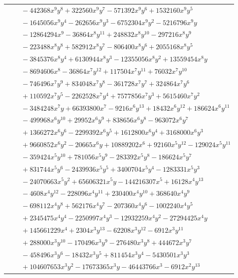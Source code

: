 \documentclass[11pt]{article}
\begin{document}
\begin{longtable}{@{}ll@{}}
 & $\quad -442368x^{9}y^{8}+322560x^{9}y^{7}-571392x^{9}y^{6}+1532160x^{9}y^{5}$\\
 & $\quad -1645056x^{9}y^{4}-262656x^{9}y^{3}-6752304x^{9}y^{2}-5216796x^{9}y$\\
 & $\quad -12864294x^{9}-36864x^{8}y^{11}+248832x^{8}y^{10}-297216x^{8}y^{9}$\\
 & $\quad -223488x^{8}y^{8}+582912x^{8}y^{7}-806400x^{8}y^{6}+2055168x^{8}y^{5}$\\
 & $\quad -3845376x^{8}y^{4}+6130944x^{8}y^{3}-12355056x^{8}y^{2}+13559454x^{8}y$\\
 & $\quad -8694606x^{8}-36864x^{7}y^{12}+117504x^{7}y^{11}+76032x^{7}y^{10}$\\
 & $\quad -746496x^{7}y^{9}+834048x^{7}y^{8}-361728x^{7}y^{7}+324864x^{7}y^{6}$\\
 & $\quad +110592x^{7}y^{5}-2262528x^{7}y^{4}+7577856x^{7}y^{3}+5615460x^{7}y^{2}$\\
 & $\quad -3484248x^{7}y+66393800x^{7}-9216x^{6}y^{13}+18432x^{6}y^{12}+186624x^{6}y^{11}$\\
 & $\quad -499968x^{6}y^{10}+29952x^{6}y^{9}+838656x^{6}y^{8}-963072x^{6}y^{7}$\\
 & $\quad +1366272x^{6}y^{6}-2299392x^{6}y^{5}+1612800x^{6}y^{4}+3168000x^{6}y^{3}$\\
 & $\quad +9660852x^{6}y^{2}-20665x^{6}y+10889202x^{6}+92160x^{5}y^{12}-129024x^{5}y^{11}$\\
 & $\quad -359424x^{5}y^{10}+781056x^{5}y^{9}-283392x^{5}y^{8}-186624x^{5}y^{7}$\\
 & $\quad +831744x^{5}y^{6}-2439936x^{5}y^{5}+3400704x^{5}y^{4}-1283331x^{5}y^{3}$\\
 & $\quad -24070663x^{5}y^{2}+65606321x^{5}y-144216307x^{5}+16128x^{4}y^{13}$\\
 & $\quad -4608x^{4}y^{12}-228096x^{4}y^{11}+230400x^{4}y^{10}+368640x^{4}y^{9}$\\
 & $\quad -698112x^{4}y^{8}+562176x^{4}y^{7}-207360x^{4}y^{6}-1002240x^{4}y^{5}$\\
 & $\quad +2345475x^{4}y^{4}-2250997x^{4}y^{3}-12932259x^{4}y^{2}-27294425x^{4}y$\\
 & $\quad +145661229x^{4}+2304x^{3}y^{13}-62208x^{3}y^{12}-6912x^{3}y^{11}$\\
 & $\quad +288000x^{3}y^{10}-170496x^{3}y^{9}-276480x^{3}y^{8}+444672x^{3}y^{7}$\\
 & $\quad -458496x^{3}y^{6}-18432x^{3}y^{5}+811454x^{3}y^{4}-5430501x^{3}y^{3}$\\
 & $\quad +104607653x^{3}y^{2}-17673365x^{3}y-46443766x^{3}-6912x^{2}y^{13}$\\

\end{longtable}
\end{document}
